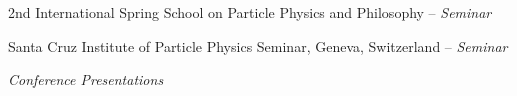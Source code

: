 \documentclass[11pt,letterpaper]{article}
\begin{document}
\begin{itemizetighter}
    \item 2nd International Spring School on Particle Physics and Philosophy -- \emph{Seminar}

    \item Santa Cruz Institute of Particle Physics Seminar, Geneva, Switzerland -- \emph{Seminar} %



\end{itemizetighter}

  \emph{Conference Presentations}
\end{document}
